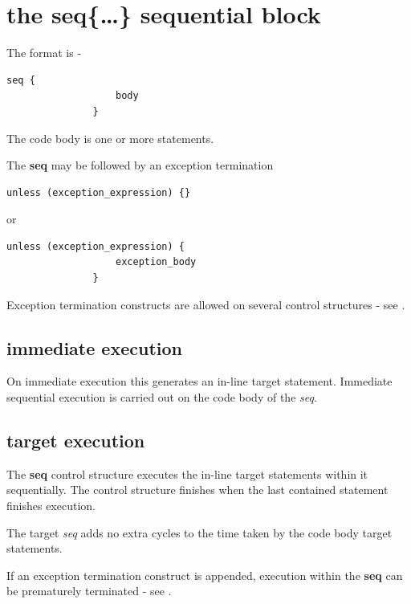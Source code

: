     \section{the {\bf seq\{\dots\}} sequential block}

        The format is -
        \begin{lstlisting}[gobble=8, language=threepl]
               seq {
                   body
               }
        \end{lstlisting}
        The code body is one or more statements.
        
        The {\bf seq} may be followed by an exception termination
        \begin{lstlisting}[gobble=8, language=threepl]
               unless (exception_expression) {}
        \end{lstlisting}
        or
        \begin{lstlisting}[gobble=8, language=threepl]
               unless (exception_expression) {
                   exception_body
               }
        \end{lstlisting}
        
        Exception termination constructs are allowed on several control structures
        - see .
        
        \subsection{immediate execution}
        
            On immediate execution this generates an in-line target statement.
            Immediate sequential execution is carried out on the code body
            of the {\em seq}.
        
        \subsection{target execution}

            The {\bf seq} control structure executes the in-line target
            statements within it sequentially. The control structure
            finishes when the last contained statement finishes execution.
            
            The target {\em seq} adds no extra cycles to the time taken
            by the code body target statements.

            If an exception termination construct is appended, execution within
            the {\bf seq} can be prematurely terminated
            - see .



